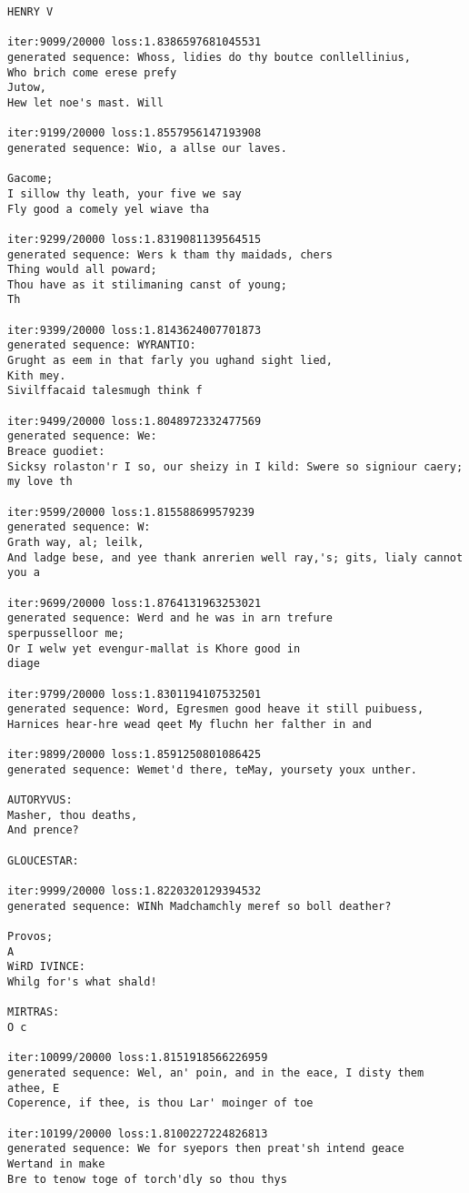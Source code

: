 \documentclass[11pt]{article}
\begin{document}
\begin{Verbatim}[commandchars=\\\{\}]
HENRY V

iter:9099/20000 loss:1.8386597681045531
generated sequence: Whoss, lidies do thy boutce conllellinius,
Who brich come erese prefy
Jutow,
Hew let noe's mast. Will

iter:9199/20000 loss:1.8557956147193908
generated sequence: Wio, a allse our laves.

Gacome;
I sillow thy leath, your five we say
Fly good a comely yel wiave tha

iter:9299/20000 loss:1.8319081139564515
generated sequence: Wers k tham thy maidads, chers
Thing would all poward;
Thou have as it stilimaning canst of young;
Th

iter:9399/20000 loss:1.8143624007701873
generated sequence: WYRANTIO:
Grught as eem in that farly you ughand sight lied,
Kith mey.
Sivilffacaid talesmugh think f

iter:9499/20000 loss:1.8048972332477569
generated sequence: We:
Breace guodiet:
Sicksy rolaston'r I so, our sheizy in I kild: Swere so signiour caery; my love th

iter:9599/20000 loss:1.815588699579239
generated sequence: W:
Grath way, al; leilk,
And ladge bese, and yee thank anrerien well ray,'s; gits, lialy cannot you a

iter:9699/20000 loss:1.8764131963253021
generated sequence: Werd and he was in arn trefure
sperpusselloor me;
Or I welw yet evengur-mallat is Khore good in
diage

iter:9799/20000 loss:1.8301194107532501
generated sequence: Word, Egresmen good heave it still puibuess,
Harnices hear-hre wead qeet My fluchn her falther in and

iter:9899/20000 loss:1.8591250801086425
generated sequence: Wemet'd there, teMay, yoursety youx unther.

AUTORYVUS:
Masher, thou deaths,
And prence?

GLOUCESTAR:

iter:9999/20000 loss:1.8220320129394532
generated sequence: WINh Madchamchly meref so boll deather?

Provos;
A
WiRD IVINCE:
Whilg for's what shald!

MIRTRAS:
O c

iter:10099/20000 loss:1.8151918566226959
generated sequence: Wel, an' poin, and in the eace, I disty them athee, E
Coperence, if thee, is thou Lar' moinger of toe

iter:10199/20000 loss:1.8100227224826813
generated sequence: We for syepors then preat'sh intend geace
Wertand in make
Bre to tenow toge of torch'dly so thou thys


\end{Verbatim}
\end{document}
